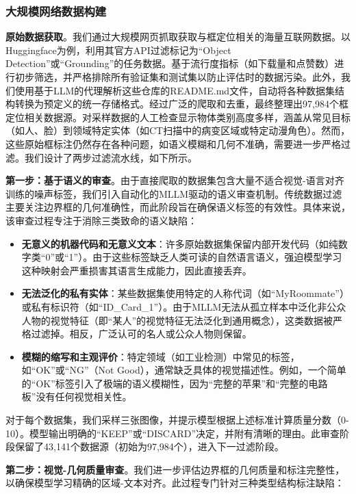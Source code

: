 \documentclass[11pt,a4paper]{article}
\begin{document}
\subsubsection{大规模网络数据构建}

\textbf{原始数据获取}。我们通过大规模网页抓取获取与框定位相关的海量互联网数据。以Huggingface为例，利用其官方API过滤标记为“Object Detection”或“Grounding”的任务数据。基于流行度指标（如下载量和点赞数）进行初步筛选，并严格排除所有验证集和测试集以防止评估时的数据污染。此外，我们使用基于LLM的代理解析这些仓库的README.md文件，自动将各种数据集结构转换为预定义的统一存储格式。经过广泛的爬取和去重，最终整理出97,984个框定位相关数据源。对采样数据的人工检查显示物体类别高度多样，涵盖从常见目标（如人、脸）到领域特定实体（如CT扫描中的病变区域或特定动漫角色）。然而，这些原始框标注仍然存在各种问题，如语义模糊和几何不准确，需要进一步严格过滤。我们设计了两步过滤流水线，如下所示。

\textbf{第一步：基于语义的审查}。由于直接爬取的数据集包含大量不适合视觉-语言对齐训练的噪声标签，我们引入自动化的MLLM驱动的语义审查机制。传统数据过滤主要关注边界框的几何准确性，而此阶段旨在确保语义标签的有效性。具体来说，该审查过程专注于消除三类致命的语义缺陷：

\begin{itemize}
    \item \textbf{无意义的机器代码和无意义文本}：许多原始数据集保留内部开发代码（如纯数字类“0”或“1”）。由于这些标签缺乏人类可读的自然语言语义，强迫模型学习这种映射会严重损害其语言生成能力，因此直接丢弃。
    \item \textbf{无法泛化的私有实体}：某些数据集使用特定的人称代词（如“MyRoommate”）或私有标识符（如“ID\_Card\_1”）。由于MLLM无法从孤立样本中泛化非公众人物的视觉特征（即“某人”的视觉特征无法泛化到通用概念），这类数据被严格过滤掉。相反，广泛认可的名人或公众人物则保留。
    \item \textbf{模糊的缩写和主观评价}：特定领域（如工业检测）中常见的标签，如“OK”或“NG”（Not Good），通常缺乏具体的视觉描述性。例如，一个简单的“OK”标签引入了极端的语义模糊性，因为“完整的苹果”和“完整的电路板”没有任何视觉相关性。
\end{itemize}

对于每个数据集，我们采样三张图像，并提示模型根据上述标准计算质量分数（0-10）。模型输出明确的“KEEP”或“DISCARD”决定，并附有清晰的理由。此审查阶段保留了43,141个数据源（初始为97,984个），进入下一过滤阶段。

\textbf{第二步：视觉-几何质量审查}。我们进一步评估边界框的几何质量和标注完整性，以确保模型学习精确的区域-文本对齐。此过程专门针对三种类型结构标注缺陷：
\end{document}
